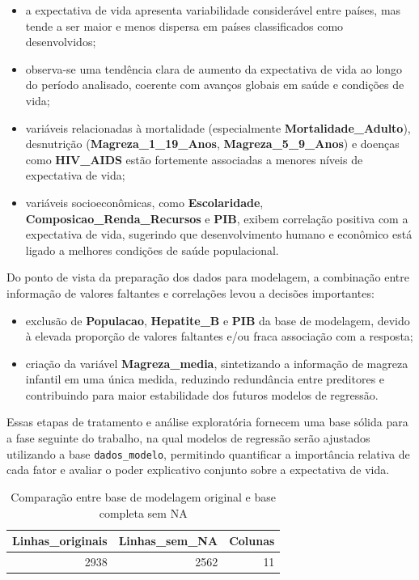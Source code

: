 \documentclass[
  12pt,
]{article}
\providecommand{\tightlist}{%
  \setlength{\itemsep}{0pt}\setlength{\parskip}{0pt}}
\begin{document}
\begin{itemize}
\tightlist
\item
  a expectativa de vida apresenta variabilidade considerável entre
  países, mas tende a ser maior e menos dispersa em países classificados
  como desenvolvidos;
\item
  observa-se uma tendência clara de aumento da expectativa de vida ao
  longo do período analisado, coerente com avanços globais em saúde e
  condições de vida;
\item
  variáveis relacionadas à mortalidade (especialmente
  \textbf{Mortalidade\_Adulto}), desnutrição
  (\textbf{Magreza\_1\_19\_Anos}, \textbf{Magreza\_5\_9\_Anos}) e
  doenças como \textbf{HIV\_AIDS} estão fortemente associadas a menores
  níveis de expectativa de vida;
\item
  variáveis socioeconômicas, como \textbf{Escolaridade},
  \textbf{Composicao\_Renda\_Recursos} e \textbf{PIB}, exibem correlação
  positiva com a expectativa de vida, sugerindo que desenvolvimento
  humano e econômico está ligado a melhores condições de saúde
  populacional.
\end{itemize}

Do ponto de vista da preparação dos dados para modelagem, a combinação
entre informação de valores faltantes e correlações levou a decisões
importantes:

\begin{itemize}
\tightlist
\item
  exclusão de \textbf{Populacao}, \textbf{Hepatite\_B} e \textbf{PIB} da
  base de modelagem, devido à elevada proporção de valores faltantes
  e/ou fraca associação com a resposta;
\item
  criação da variável \textbf{Magreza\_media}, sintetizando a informação
  de magreza infantil em uma única medida, reduzindo redundância entre
  preditores e contribuindo para maior estabilidade dos futuros modelos
  de regressão.
\end{itemize}

Essas etapas de tratamento e análise exploratória fornecem uma base
sólida para a fase seguinte do trabalho, na qual modelos de regressão
serão ajustados utilizando a base \texttt{dados\_modelo}, permitindo
quantificar a importância relativa de cada fator e avaliar o poder
explicativo conjunto sobre a expectativa de vida.

\begin{longtable}[t]{rrr}
\caption{\label{tab:unnamed-chunk-14}Comparação entre base de modelagem original e base completa sem NA}\\
\toprule
Linhas\_originais & Linhas\_sem\_NA & Colunas\\
\midrule
2938 & 2562 & 11\\
\bottomrule
\end{longtable}
\end{document}
